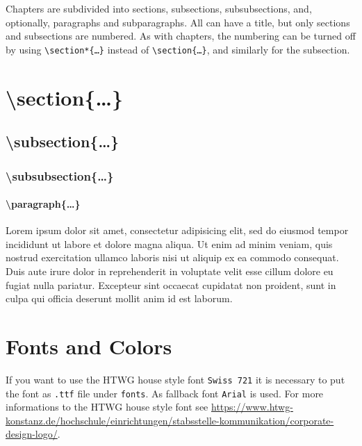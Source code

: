 Chapters are subdivided into sections, subsections, subsubsections, and, optionally, paragraphs and subparagraphs. All can have a title, but only sections and subsections are numbered. As with chapters, the numbering can be turned off by using \texttt{\textbackslash section*\{\ldots\}} instead of \texttt{\textbackslash section\{\ldots\}}, and similarly for the subsection.
\section{\textbackslash section\{\ldots\}}
\subsection{\textbackslash subsection\{\ldots\}}
\subsubsection{\textbackslash subsubsection\{\ldots\}}
\paragraph{\textbackslash paragraph\{\ldots\}}
Lorem ipsum dolor sit amet, consectetur adipisicing elit, sed do eiusmod tempor incididunt ut labore et dolore magna aliqua. Ut enim ad minim veniam, quis nostrud exercitation ullamco laboris nisi ut aliquip ex ea commodo consequat. Duis aute irure dolor in reprehenderit in voluptate velit esse cillum dolore eu fugiat nulla pariatur. Excepteur sint occaecat cupidatat non proident, sunt in culpa qui officia deserunt mollit anim id est laborum.

\section{Fonts and Colors}

If you want to use the HTWG house style font \texttt{Swiss 721} it is necessary to put the font as \texttt{.ttf} file under \texttt{fonts}. As fallback font \texttt{Arial} is used. For more informations to the HTWG house style font see \url{https://www.htwg-konstanz.de/hochschule/einrichtungen/stabsstelle-kommunikation/corporate-design-logo/}.



